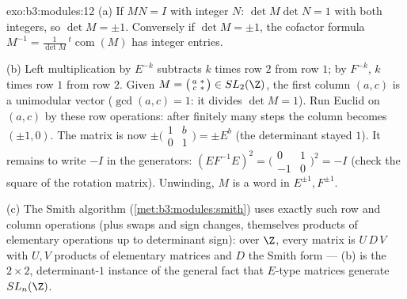 \begin{solution}{exo:b3:modules:12}
(a) If $MN = I$ with integer $N$: $\det M\det N = 1$ with
both integers, so $\det M = \pm1$. Conversely if $\det M =
\pm1$, the cofactor formula $M^{-1} =
\frac1{\det M}\,{}^t\!\operatorname{com}(M)$ has integer
entries.

(b) Left multiplication by $E^{-k}$ subtracts $k$ times row
$2$ from row $1$; by $F^{-k}$, $k$ times row $1$ from row
$2$. Given $M = \bigl(\begin{smallmatrix}a & *\\ c &
*\end{smallmatrix}\bigr) \in SL_2(\Z)$, the first column
$(a, c)$ is a unimodular vector ($\gcd(a, c) = 1$: it
divides $\det M = 1$). Run Euclid on $(a, c)$ by these row
operations: after finitely many steps the column becomes
$(\pm1, 0)$. The matrix is now $\pm
\bigl(\begin{smallmatrix}1 & b\\ 0 & 1\end{smallmatrix}
\bigr) = \pm E^{b}$ (the determinant stayed $1$). It remains
to write $-I$ in the generators: $(EF^{-1}E)^2 =
\bigl(\begin{smallmatrix}0 & 1\\ -1 &
0\end{smallmatrix}\bigr)^2 = -I$ (check the square of the
rotation matrix). Unwinding, $M$ is a word in $E^{\pm1},
F^{\pm1}$.

(c) The Smith algorithm (\cref{met:b3:modules:smith}) uses
exactly such row and column operations (plus swaps and sign
changes, themselves products of elementary operations up to
determinant sign): over $\Z$, every matrix is
$U\,D\,V$ with $U, V$ products of elementary matrices and
$D$ the Smith form --- (b) is the $2\times2$, determinant-$1$
instance of the general fact that $E$-type matrices generate
$SL_n(\Z)$.
\end{solution}

